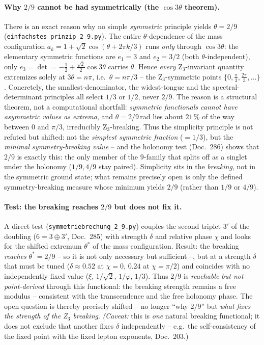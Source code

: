 \paragraph{Why $2/9$ cannot be had symmetrically (the $\cos3\theta$ theorem).} There is an exact reason
why no simple \emph{symmetric} principle yields $\theta=2/9$ (\texttt{einfachstes\_prinzip\_2\_9.py}).
The entire $\theta$-dependence of the mass configuration $a_k=1+\sqrt2\cos(\theta+2\pi k/3)$ runs
\emph{only} through $\cos3\theta$: the elementary symmetric functions are $e_1=3$ and $e_2=3/2$ (both
$\theta$-independent), only $e_3=\det=-\tfrac12+\tfrac{\sqrt2}{2}\cos3\theta$ carries $\theta$. Hence
\emph{every} Z$_3$-invariant quantity extremizes solely at $3\theta=n\pi$, i.e.\ $\theta=n\pi/3$ -- the
Z$_3$-symmetric points $\{0,\tfrac{\pi}{3},\tfrac{2\pi}{3},\dots\}$. Concretely, the smallest-denominator,
the widest-tongue and the spectral-determinant principles all select $1/3$ or $1/2$, never $2/9$. The
reason is a structural theorem, not a computational shortfall: \emph{symmetric functionals cannot have
asymmetric values as extrema}, and $\theta=2/9$\,rad lies about $21\,\%$ of the way between $0$ and $\pi/3$, irreducibly
Z$_3$-breaking. Thus the simplicity principle is not refuted but shifted: not the \emph{simplest
symmetric fraction} ($=1/3$), but the \emph{minimal symmetry-breaking value} -- and the holonomy test
(Doc.~286) shows that $2/9$ is exactly this: the only member of the $9$-family that splits off as a
singlet under the holonomy ($1/9,4/9$ stay paired). Simplicity sits in the \emph{breaking}, not in the
symmetric ground state; what remains precisely open is only the defined symmetry-breaking measure whose
minimum yields $2/9$ (rather than $1/9$ or $4/9$).

\paragraph{Test: the breaking reaches $2/9$ but does not fix it.} A direct test
(\texttt{symmetriebrechung\_2\_9.py}) couples the second triplet $3'$ of the doubling ($6=3\oplus3'$,
Doc.~285) with strength $\delta$ and relative phase $\chi$ and looks for the shifted extremum
$\theta^*$ of the mass configuration. Result: the breaking \emph{reaches} $\theta^*=2/9$ -- so it is not
only necessary but sufficient --, but at a strength $\delta$ that must be tuned ($\delta\approx0.52$ at
$\chi=0$, $0.24$ at $\chi=\pi/2$) and coincides with no independently fixed value ($\xi$, $1/\sqrt2$,
$1/\varphi$, $1/3$). Thus $2/9$ is \emph{reachable but not point-derived} through this functional: the
breaking strength remains a free modulus -- consistent with the transcendence and the free holonomy
phase. The open question is thereby precisely shifted -- no longer \enquote{why $2/9$} but \emph{what
fixes the strength of the Z$_3$ breaking}. \emph{(Caveat:} this is \emph{one} natural breaking
functional; it does not exclude that another fixes $\delta$ independently -- e.g.\ the self-consistency
of the fixed point with the fixed lepton exponents, Doc.~203.)

